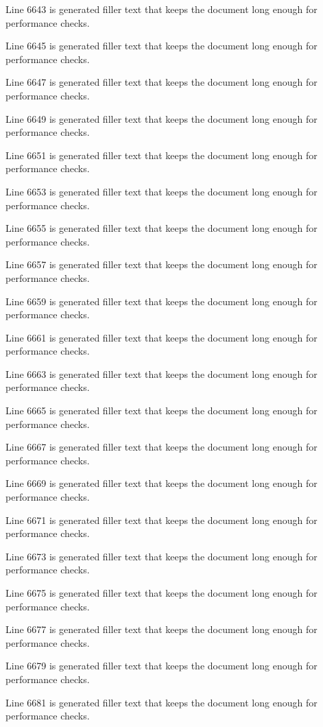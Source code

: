 Line 6643 is generated filler text that keeps the document long enough for performance checks.

Line 6645 is generated filler text that keeps the document long enough for performance checks.

Line 6647 is generated filler text that keeps the document long enough for performance checks.

Line 6649 is generated filler text that keeps the document long enough for performance checks.

Line 6651 is generated filler text that keeps the document long enough for performance checks.

Line 6653 is generated filler text that keeps the document long enough for performance checks.

Line 6655 is generated filler text that keeps the document long enough for performance checks.

Line 6657 is generated filler text that keeps the document long enough for performance checks.

Line 6659 is generated filler text that keeps the document long enough for performance checks.

Line 6661 is generated filler text that keeps the document long enough for performance checks.

Line 6663 is generated filler text that keeps the document long enough for performance checks.

Line 6665 is generated filler text that keeps the document long enough for performance checks.

Line 6667 is generated filler text that keeps the document long enough for performance checks.

Line 6669 is generated filler text that keeps the document long enough for performance checks.

Line 6671 is generated filler text that keeps the document long enough for performance checks.

Line 6673 is generated filler text that keeps the document long enough for performance checks.

Line 6675 is generated filler text that keeps the document long enough for performance checks.

Line 6677 is generated filler text that keeps the document long enough for performance checks.

Line 6679 is generated filler text that keeps the document long enough for performance checks.

Line 6681 is generated filler text that keeps the document long enough for performance checks.

